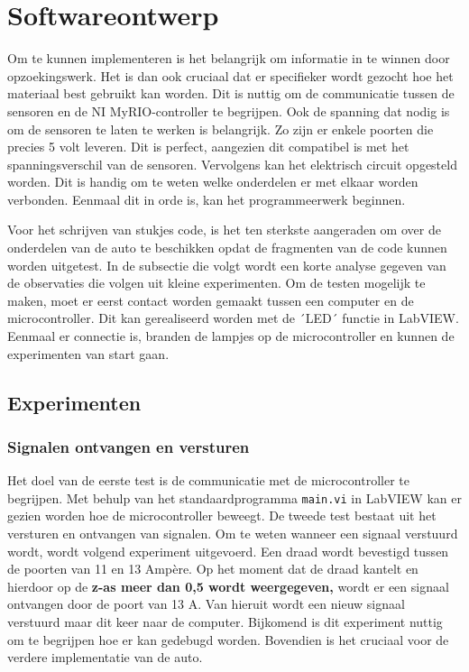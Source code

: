 \documentclass[a4paper,twoside,kulak]{kulakreport} %
\begin{document}
\label{Assemblage}

\section{Softwareontwerp}\label{Softwareontwerp}

Om te kunnen implementeren is het belangrijk om informatie in te winnen door opzoekingswerk. Het is dan ook cruciaal dat er specifieker wordt gezocht hoe het materiaal best gebruikt kan worden.
Dit is nuttig om de communicatie tussen de sensoren en de NI MyRIO-controller te begrijpen. Ook de spanning dat nodig is om de sensoren te laten te werken is belangrijk. Zo zijn er enkele poorten die precies 5 volt leveren. Dit is perfect, aangezien dit compatibel is met het spanningsverschil van de sensoren. Vervolgens kan het elektrisch circuit opgesteld worden. Dit is handig om te weten welke onderdelen er met elkaar worden verbonden. Eenmaal dit in orde is, kan het programmeerwerk beginnen.

Voor het schrijven van stukjes code, is het ten sterkste aangeraden om over de onderdelen van de auto te beschikken opdat de fragmenten van de code kunnen worden uitgetest. In de subsectie die volgt wordt een korte analyse gegeven van de observaties die volgen uit kleine experimenten. Om de testen mogelijk te maken, moet er eerst contact worden gemaakt tussen een computer en de microcontroller. Dit kan gerealiseerd worden met de ´LED´ functie in LabVIEW. Eenmaal er connectie is, branden de lampjes op de microcontroller en kunnen de experimenten van start gaan.


\subsection{Experimenten}
\subsubsection{Signalen ontvangen en versturen}
Het doel van de eerste test is de communicatie met de microcontroller te begrijpen. Met behulp van het standaardprogramma \texttt{main.vi} in LabVIEW kan er gezien worden hoe de microcontroller beweegt.  
De tweede test bestaat uit het versturen en ontvangen van signalen. Om te weten wanneer een signaal verstuurd wordt, wordt volgend experiment uitgevoerd. Een draad wordt bevestigd tussen de poorten van 11 en 13 Ampère. Op het moment dat de draad kantelt en hierdoor op de \textbf{z-as meer dan 0,5 wordt weergegeven,}%
wordt er een signaal ontvangen door de poort van 13 A. Van hieruit wordt een nieuw signaal verstuurd maar dit keer naar de computer. Bijkomend is dit experiment nuttig om te begrijpen hoe er kan gedebugd worden. Bovendien is het cruciaal voor de verdere implementatie van de auto.  
\end{document}
